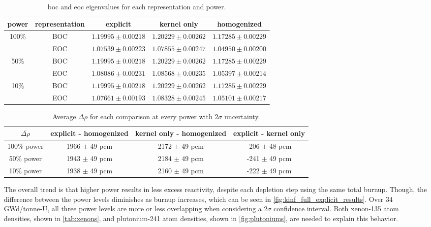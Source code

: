 \documentclass[letterpaper]{physor2024}
\begin{document}
\begin{table}[!h]
    \centering
    \caption{\gls{boc} and \gls{eoc} eigenvalues for each representation and power.}
    \begin{tabular}{|c|c|c|c|c|} \hline
    \multicolumn{1}{|c|}{power} & \multicolumn{1}{c|}{representation} & \multicolumn{1}{c|}{explicit} & \multicolumn{1}{c|}{kernel only} & \multicolumn{1}{c|}{homogenized} \\
    \hline
    \multirow{2}{*}{100\%} & BOC & $1.19995 \pm 0.00218$ & $1.20229 \pm 0.00262$ & $1.17285 \pm 0.00229 $ \\
    \cline{2-5}
     & EOC & $1.07539 \pm 0.00223$ & $1.07855 \pm 0.00247$ & $1.04950 \pm 0.00200 $ \\
    \hline
    \multirow{2}{*}{50\%} & BOC & $1.19995 \pm 0.00218$ & $1.20229 \pm 0.00262$ & $1.17285 \pm 0.00229$ \\
    \cline{2-5}
     & EOC & $1.08086 \pm 0.00231$ & $1.08568 \pm 0.00235$ & $1.05397 \pm 0.00214$ \\
     \hline
    \multirow{2}{*}{10\%} & BOC & $1.19995 \pm 0.00218$ & $1.20229 \pm 0.00262$ & $1.17285 \pm 0.00229$ \\
    \cline{2-5}
     & EOC & $1.07661 \pm 0.00193$ & $1.08328 \pm  0.00245$ & $1.05101 \pm 0.00217$ \\
    \cline{1-5}
    \end{tabular}
    \label{tab:begin_to_end}
    \vspace*{-0.3cm}
\end{table}

\begin{table}[!h]
    \centering
    \caption{Average $\Delta \rho$ for each comparison at every power with $2\sigma$ uncertainty.}
    \begin{tabular}{c|c|c|c}
    $\overline{\Delta \rho}$ & explicit - homogenized & kernel only - homogenized & explicit - kernel only \\ \hline
    100\% power & 1966 $\pm$ 49 pcm & 2172 $\pm$ 49 pcm & -206 $\pm$ 48 pcm \\
    50\% power & 1943 $\pm$ 49 pcm & 2184 $\pm$ 49 pcm & -241 $\pm$ 49 pcm\\
    10\% power & 1938 $\pm$ 49 pcm & 2160 $\pm$ 49 pcm & -222 $\pm$ 49 pcm
    \end{tabular}
    \label{tab:average_pcms}
\end{table}

The overall trend is that higher power results in less excess reactivity, despite each depletion step using the same total burnup. Though, the difference between the power levels diminishes as burnup increases, which can be seen in \cref{fig:kinf_full_explicit_results}. Over 34 GWd/tonne-U, all three power levels \kinf are more or less overlapping when considering a $2\sigma$ confidence interval. Both xenon-135 atom densities, shown in \cref{tab:xenons}, and plutonium-241 atom densities, shown in \cref{fig:plutoniums}, are needed to explain this behavior.
\end{document}
